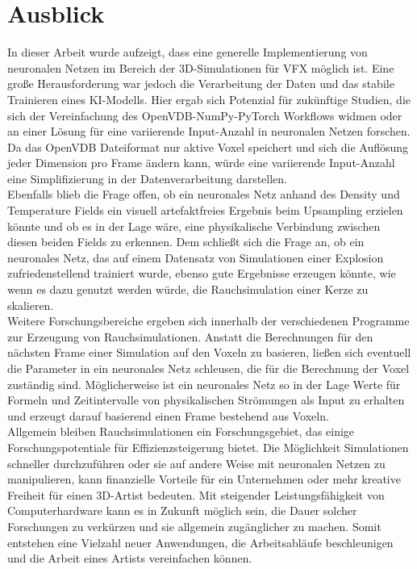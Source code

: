 \chapter{Ausblick}
\thispagestyle{fancy}

In dieser Arbeit wurde aufzeigt, dass eine generelle Implementierung von neuronalen Netzen im Bereich der 3D-Simulationen für VFX möglich ist. Eine große Herausforderung war jedoch die Verarbeitung der Daten und das stabile Trainieren eines KI-Modells. Hier ergab sich Potenzial für zukünftige Studien, die sich der Vereinfachung des OpenVDB-NumPy-PyTorch Workflows widmen oder an einer Lösung für eine variierende Input-Anzahl in neuronalen Netzen forschen. Da das OpenVDB Dateiformat nur aktive Voxel speichert und sich die Auflösung jeder Dimension pro Frame ändern kann, würde eine variierende Input-Anzahl eine Simplifizierung in der Datenverarbeitung darstellen.\\

Ebenfalls blieb die Frage offen, ob ein neuronales Netz anhand des Density und Temperature Fields ein visuell artefaktfreies Ergebnis beim Upsampling erzielen könnte und ob es in der Lage wäre, eine physikalische Verbindung zwischen diesen beiden Fields zu erkennen. Dem schließt sich die Frage an, ob ein neuronales Netz, das auf einem Datensatz von Simulationen einer Explosion zufriedenstellend trainiert wurde, ebenso gute Ergebnisse erzeugen könnte, wie wenn es dazu genutzt werden würde, die Rauchsimulation einer Kerze zu skalieren. \\
Weitere Forschungsbereiche ergeben sich innerhalb der verschiedenen Programme zur Erzeugung von Rauchsimulationen. Anstatt die Berechnungen für den nächsten Frame einer Simulation auf den Voxeln zu basieren, ließen sich eventuell die Parameter in ein neuronales Netz schleusen, die für die Berechnung der Voxel zuständig sind. Möglicherweise ist ein neuronales Netz so in der Lage Werte für Formeln und Zeitintervalle von physikalischen Strömungen als Input zu erhalten und erzeugt darauf basierend einen Frame bestehend aus Voxeln. \\

Allgemein bleiben Rauchsimulationen ein Forschungsgebiet, das einige Forschungspotentiale für Effizienzsteigerung bietet. Die Möglichkeit Simulationen schneller durchzuführen oder sie auf andere Weise mit neuronalen Netzen zu manipulieren, kann finanzielle Vorteile für ein Unternehmen oder mehr kreative Freiheit für einen 3D-Artist bedeuten. Mit steigender Leistungsfähigkeit von Computerhardware kann es in Zukunft möglich sein, die Dauer solcher Forschungen zu verkürzen und sie allgemein zugänglicher zu machen. Somit entstehen eine Vielzahl neuer Anwendungen, die Arbeitsabläufe beschleunigen und die Arbeit eines Artists vereinfachen können.